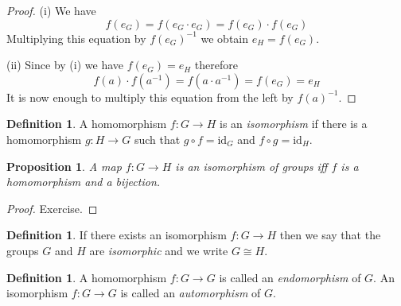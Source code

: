 \documentclass[12pt, letterpaper, oneside]{article}
\theoremstyle{plain}
\newtheorem{proposition}[theorem]{Proposition}
\theoremstyle{definition}
\newtheorem{definition}[theorem]{Definition}
\newcommand{\id}{\mathrm{id}}
\newcommand{\vs}{\vskip 5mm}
\begin{document}
\begin{proof}
(i) We have 
$$f(e_{G})=f(e_{G}\cdot e_{G})=f(e_{G})\cdot f(e_{G})$$
Multiplying this equation by $f(e_{G})^{-1}$ we obtain $e_{H}=f(e_{G})$.

(ii) Since by (i) we have $f(e_{G})=e_{H}$ therefore 
$$f(a)\cdot f(a^{-1})=f(a\cdot a^{-1})=f(e_{G})=e_{H}$$
It is now enough to multiply this equation from the left by $f(a)^{-1}$.
\end{proof}


\vs


\begin{definition}
A homomorphism $f\colon G\to H$ is an \emph{isomorphism} if there is a homomorphism
$g\colon H\to G$ such that $g\circ f = \id_{G}$ and $f\circ g = \id_{H}$.
\end{definition}


\vs 

\begin{proposition}
A map $f\colon G\to H$ is an isomorphism of groups iff $f$ is a homomorphism and a bijection.  
\end{proposition}

\begin{proof}
Exercise.
\end{proof}

\vs


\begin{definition}
If there exists an isomorphism $f\colon G\to H$ then we say 
that the groups $G$ and $H$ are \emph{isomorphic} and we write $G\cong H$.
\end{definition}

\begin{definition}
A homomorphism $f\colon G\to G$ is called an \emph{endomorphism} of $G$.
An isomorphism  $f\colon G\to G$ is called an \emph{automorphism} of $G$.
\end{definition}


\vs
\end{document}
